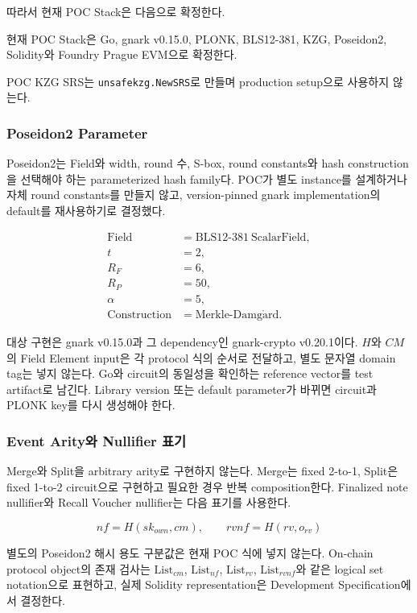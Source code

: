 \documentclass[11pt]{extarticle}
\newcommand{\List}[1]{\mathrm{List}_{#1}}
\begin{document}
따라서 현재 POC Stack은 다음으로 확정한다.

현재 POC Stack은 Go, gnark v0.15.0, PLONK, BLS12-381, KZG, Poseidon2,
Solidity와 Foundry Prague EVM으로 확정한다.

POC KZG SRS는 \texttt{unsafekzg.NewSRS}로 만들며 production setup으로 사용하지 않는다.

\subsubsection{Poseidon2 Parameter}

Poseidon2는 Field와 width, round 수, S-box, round constants와 hash construction을
선택해야 하는 parameterized hash family다. POC가 별도 instance를 설계하거나 자체
round constants를 만들지 않고, version-pinned gnark implementation의 default를
재사용하기로 결정했다.

\[
\begin{aligned}
\mathrm{Field} &= \mathrm{BLS12\text{-}381\ ScalarField},\\
t &= 2,\\
R_F &= 6,\\
R_P &= 50,\\
\alpha &= 5,\\
\mathrm{Construction} &= \mathrm{Merkle\text{-}Damg\mathring{a}rd}.
\end{aligned}
\]

대상 구현은 gnark v0.15.0과 그 dependency인 gnark-crypto v0.20.1이다. $H$와
$CM$의 Field Element input은 각 protocol 식의 순서로 전달하고, 별도 문자열 domain
tag는 넣지 않는다. Go와 circuit의 동일성을 확인하는 reference vector를 test artifact로
남긴다. Library version 또는 default parameter가 바뀌면 circuit과 PLONK key를 다시
생성해야 한다.

\subsubsection{Event Arity와 Nullifier 표기}

Merge와 Split을 arbitrary arity로 구현하지 않는다. Merge는 fixed 2-to-1,
Split은 fixed 1-to-2 circuit으로 구현하고 필요한 경우 반복 composition한다.
Finalized note nullifier와 Recall Voucher nullifier는 다음 표기를 사용한다.

\[
nf=H(sk_{own},cm),
\qquad
rvnf=H(rv,o_{rv})
\]

별도의 Poseidon2 해시 용도 구분값은 현재 POC 식에 넣지 않는다. On-chain protocol object의
존재 검사는 $\List{cm}$, $\List{nf}$, $\List{rv}$, $\List{rvnf}$와 같은
logical set notation으로 표현하고, 실제 Solidity representation은 Development
Specification에서 결정한다.
\end{document}
